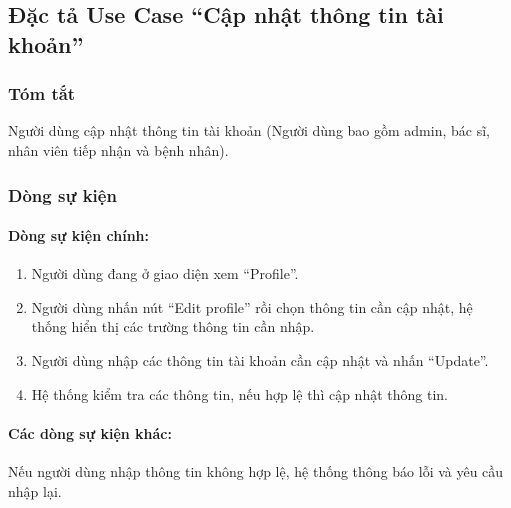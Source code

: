 \subsection{Đặc tả Use Case ``Cập nhật thông tin tài khoản''}

\subsubsection{Tóm tắt}
Người dùng cập nhật thông tin tài khoản (Người dùng bao gồm admin, bác sĩ, nhân viên tiếp nhận và bệnh nhân).

\subsubsection{Dòng sự kiện}
\paragraph{\textbf{Dòng sự kiện chính:}}
\begin{enumerate}
  \item Người dùng đang ở giao diện xem ``Profile''.
  \item Người dùng nhấn nút ``Edit profile'' rồi chọn thông tin cần cập nhật, hệ thống hiển thị các trường thông tin cần nhập.
  \item Người dùng nhập các thông tin tài khoản cần cập nhật và nhấn ``Update''.
  \item Hệ thống kiểm tra các thông tin, nếu hợp lệ thì cập nhật thông tin.
\end{enumerate}

\paragraph{\textbf{Các dòng sự kiện khác:}}
Nếu người dùng nhập thông tin không hợp lệ, hệ thống thông báo lỗi và yêu cầu nhập lại.


